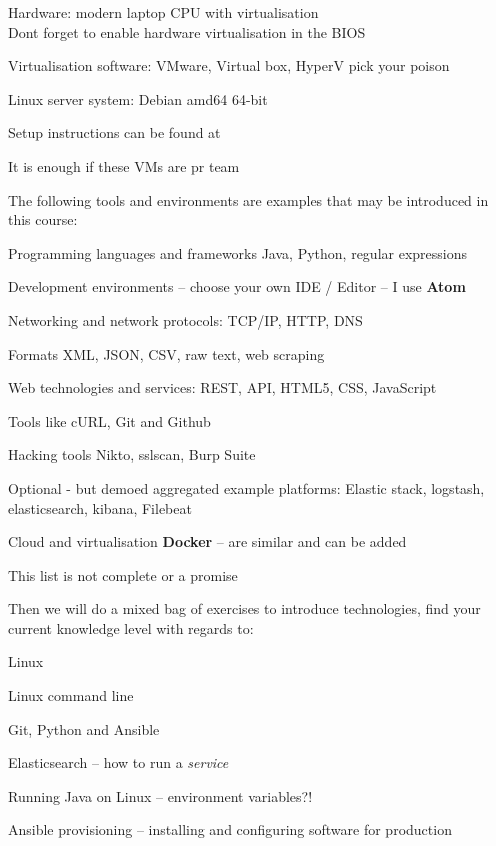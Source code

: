\documentclass[Screen16to9,17pt]{foils}
\begin{document}
\begin{list2}
\item Hardware: modern laptop CPU with virtualisation\\
Dont forget to enable hardware virtualisation in the BIOS
\item Virtualisation software: VMware, Virtual box, HyperV pick your poison
\item Linux server system: Debian amd64 64-bit 
\item Setup instructions can be found at 
\end{list2}

\centerline{It is enough if these VMs are pr team}



The following tools and environments are examples that may be introduced in this course:

\begin{list2}
\item Programming languages and frameworks Java, Python, regular expressions
\item Development environments -- choose your own IDE / Editor -- I use {\bf Atom}
\item Networking and network protocols: TCP/IP, HTTP, DNS
\item Formats XML, JSON, CSV, raw text, web scraping
\item Web technologies and services: REST, API, HTML5, CSS, JavaScript
\item Tools like cURL, Git and Github
\item Hacking tools Nikto, sslscan, Burp Suite
\item Optional - but demoed aggregated example platforms: Elastic stack, logstash, elasticsearch, kibana, Filebeat
\item Cloud and virtualisation {\bf Docker} -- are similar and can be added
\end{list2}

\centerline{This list is not complete or a promise }



Then we will do a mixed bag of exercises to introduce technologies, find your current knowledge level with regards to:

\begin{list2}
\item Linux
\item Linux command line
\item Git, Python and Ansible
\item Elasticsearch -- how to run a \emph{service}
\item Running Java on Linux -- environment variables?!
\item Ansible provisioning -- installing and configuring software for production
\end{list2}
\end{document}
